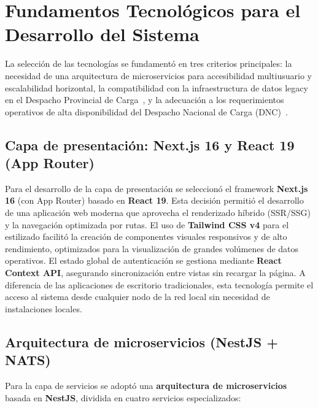 \section{Fundamentos Tecnológicos para el Desarrollo del Sistema}

La selección de las tecnologías se fundamentó en tres criterios principales: la necesidad de una arquitectura de microservicios para accesibilidad multiusuario y escalabilidad horizontal, la compatibilidad con la infraestructura de datos legacy en el Despacho Provincial de Carga~\citep{villalba2021}, y la adecuación a los requerimientos operativos de alta disponibilidad del Despacho Nacional de Carga (DNC)~\citep{union2023}.

\subsection{Capa de presentación: Next.js 16 y React 19 (App Router)}
Para el desarrollo de la capa de presentación se seleccionó el framework \textbf{Next.js 16} (con App Router) basado en \textbf{React 19}. Esta decisión permitió el desarrollo de una aplicación web moderna que aprovecha el renderizado híbrido (SSR/SSG) y la navegación optimizada por rutas. El uso de \textbf{Tailwind CSS v4} para el estilizado facilitó la creación de componentes visuales responsivos y de alto rendimiento, optimizados para la visualización de grandes volúmenes de datos operativos. El estado global de autenticación se gestiona mediante \textbf{React Context API}, asegurando sincronización entre vistas sin recargar la página. A diferencia de las aplicaciones de escritorio tradicionales, esta tecnología permite el acceso al sistema desde cualquier nodo de la red local sin necesidad de instalaciones locales.

\subsection{Arquitectura de microservicios (NestJS + NATS)}
Para la capa de servicios se adoptó una \textbf{arquitectura de microservicios} basada en \textbf{NestJS}, dividida en cuatro servicios especializados:

